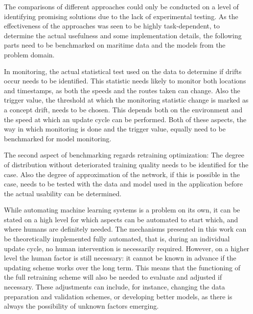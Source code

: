The comparisons of different approaches could only be conducted on a level of identifying promising solutions due to the lack of experimental testing. As the effectiveness of the approaches was seen to be highly task-dependent, to determine the actual usefulness and some implementation details, the following parts need to be benchmarked on maritime data and the models from the problem domain.

In monitoring, the actual statistical test used on the data to determine if drifts occur needs to be identified. This statistic needs likely to monitor both locations and timestamps, as both the speeds and the routes taken can change. Also the trigger value, the threshold at which the monitoring statistic change is marked as a concept drift, needs to be chosen. This depends both on the environment and the speed at which an update cycle can be performed. Both of these aspects, the way in which monitoring is done and the trigger value, equally need to be benchmarked for model monitoring.

The second aspect of benchmarking regards retraining optimization: The degree of distribution without deteriorated training quality needs to be identified for the case. Also the degree of approximation of the network, if this is possible in the case, needs to be tested with the data and model used in the application before the actual usability can be determined.

While automating machine learning systems is a problem on its own, it can be stated on a high level for which aspects can be automated to start which, and where humans are definitely needed. The mechanisms presented in this work can be theoretically implemented fully automated, that is, during an individual update cycle, no human intervention is necessarily required. However, on a higher level the human factor is still necessary: it cannot be known in advance if the updating scheme works over the long term. This means that the functioning of the full retraining scheme will also be needed to evaluate and adjusted if necessary. These adjustments can include, for instance, changing the data preparation and validation schemes, or developing better models, as there is always the possibility of unknown factors emerging.


